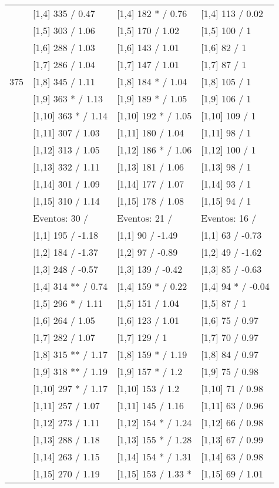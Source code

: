 \begin{table}
\begin{tabular}[t]{llll}
\addlinespace
 & {}[1,4] 335  / 0.47 & {}[1,4] 182 * / 0.76 & {}[1,4] 113  / 0.02\\
 & {}[1,5] 303  / 1.06 & {}[1,5] 170  / 1.02 & {}[1,5] 100  / 1\\
 & {}[1,6] 288  / 1.03 & {}[1,6] 143  / 1.01 & {}[1,6] 82  / 1\\
 & {}[1,7] 286  / 1.04 & {}[1,7] 147  / 1.01 & {}[1,7] 87  / 1\\
375 & {}[1,8] 345  / 1.11 & {}[1,8] 184 * / 1.04 & {}[1,8] 105  / 1\\
\addlinespace
 & {}[1,9] 363 * / 1.13 & {}[1,9] 189 * / 1.05 & {}[1,9] 106  / 1\\
 & {}[1,10] 363 * / 1.14 & {}[1,10] 192 * / 1.05 & {}[1,10] 109  / 1\\
 & {}[1,11] 307  / 1.03 & {}[1,11] 180  / 1.04 & {}[1,11] 98  / 1\\
 & {}[1,12] 313  / 1.05 & {}[1,12] 186 * / 1.06 & {}[1,12] 100  / 1\\
 & {}[1,13] 332  / 1.11 & {}[1,13] 181  / 1.06 & {}[1,13] 98  / 1\\
\addlinespace
 & {}[1,14] 301  / 1.09 & {}[1,14] 177  / 1.07 & {}[1,14] 93  / 1\\
 & {}[1,15] 310  / 1.14 & {}[1,15] 178  / 1.08 & {}[1,15] 94  / 1\\
 & Eventos:  30 / & Eventos:  21 / & Eventos:  16 /\\
 & {}[1,1] 195  / -1.18 & {}[1,1] 90  / -1.49 & {}[1,1] 63  / -0.73\\
 & {}[1,2] 184  / -1.37 & {}[1,2] 97  / -0.89 & {}[1,2] 49  / -1.62\\
\addlinespace
 & {}[1,3] 248  / -0.57 & {}[1,3] 139  / -0.42 & {}[1,3] 85  / -0.63\\
 & {}[1,4] 314 ** / 0.74 & {}[1,4] 159 * / 0.22 & {}[1,4] 94 * / -0.04\\
 & {}[1,5] 296 * / 1.11 & {}[1,5] 151  / 1.04 & {}[1,5] 87  / 1\\
 & {}[1,6] 264  / 1.05 & {}[1,6] 123  / 1.01 & {}[1,6] 75  / 0.97\\
 & {}[1,7] 282  / 1.07 & {}[1,7] 129  / 1 & {}[1,7] 70  / 0.97\\
\addlinespace
500 & {}[1,8] 315 ** / 1.17 & {}[1,8] 159 * / 1.19 & {}[1,8] 84  / 0.97\\
 & {}[1,9] 318 ** / 1.19 & {}[1,9] 157 * / 1.2 & {}[1,9] 75  / 0.98\\
 & {}[1,10] 297 * / 1.17 & {}[1,10] 153  / 1.2 & {}[1,10] 71  / 0.98\\
 & {}[1,11] 257  / 1.07 & {}[1,11] 145  / 1.16 & {}[1,11] 63  / 0.96\\
 & {}[1,12] 273  / 1.11 & {}[1,12] 154 * / 1.24 & {}[1,12] 66  / 0.98\\
\addlinespace
 & {}[1,13] 288  / 1.18 & {}[1,13] 155 * / 1.28 & {}[1,13] 67  / 0.99\\
 & {}[1,14] 263  / 1.15 & {}[1,14] 154 * / 1.31 & {}[1,14] 63  / 0.98\\
 & {}[1,15] 270  / 1.19 & {}[1,15] 153  / 1.33 * & {}[1,15] 69  / 1.01\\
\bottomrule
\end{tabular}
\end{table}
